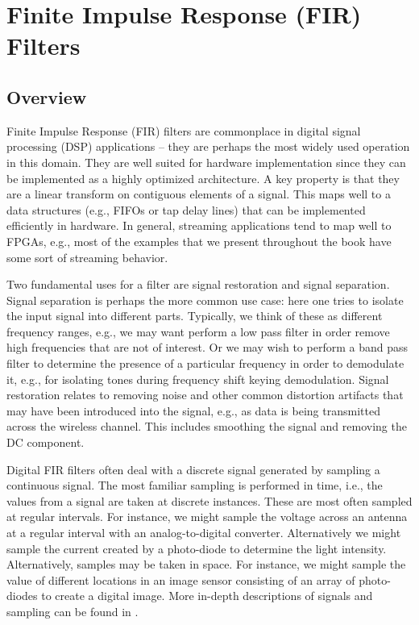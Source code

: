 
\chapter{Finite Impulse Response (FIR) Filters}
\glsresetall
\label{chapter:fir}

\section{Overview}
Finite Impulse Response (FIR) filters are commonplace in digital signal processing (DSP) applications -- they are perhaps the most widely used operation in this domain. They are well suited for hardware implementation since they can be implemented as a highly optimized architecture. A key property is that they are a linear transform on contiguous elements of a signal. This maps well to a data structures (e.g., FIFOs or tap delay lines) that can be implemented efficiently in hardware. In general, streaming applications tend to map well to FPGAs, e.g., most of the examples that we present throughout the book have some sort of streaming behavior. 

Two fundamental uses for a filter are signal restoration and signal separation. Signal separation is perhaps the more common use case: here one tries to isolate the input signal into different parts. Typically, we think of these as different frequency ranges, e.g., we may want perform a low pass filter in order remove high frequencies that are not of interest. Or we may wish to perform a band pass filter to determine the presence of a particular frequency in order to demodulate it, e.g., for isolating tones during frequency shift keying demodulation.  Signal restoration relates to removing noise and other common distortion artifacts that may have been introduced into the signal, e.g., as data is being transmitted across the wireless channel. This includes smoothing the signal and removing the DC component.

Digital FIR filters often deal with a discrete signal generated by sampling a continuous signal. The most familiar sampling is performed in time, i.e., the values from a signal are taken at discrete instances. These are most often sampled at regular intervals. For instance, we might sample the voltage across an antenna at a regular interval with an analog-to-digital converter. Alternatively we might sample the current created by a photo-diode to determine the light intensity.  Alternatively, samples may be taken in space.  For instance, we might sample the value of different locations in an image sensor consisting of an array of photo-diodes to create a digital image.  More in-depth descriptions of signals and sampling can be found in \cite{lee2011signalsandsystems}.

